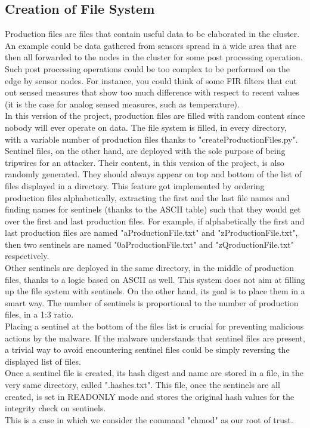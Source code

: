 \subsection{Creation of File System}
Production files are files that contain useful data to be elaborated in the cluster. An example could be data gathered from sensors spread in a wide area that are then all forwarded to the nodes in the cluster for some post processing operation. Such post processing operations could be too complex to be performed on the edge by sensor nodes. For instance, you could think of some FIR filters that cut out sensed measures that show too much difference with respect to recent values (it is the case for analog sensed measures, such as temperature).\\
In this version of the project, production files are filled with random content since nobody will ever operate on data. The file system is filled, in every directory, with a variable number of production files thanks to "createProductionFiles.py".\\
Sentinel files, on the other hand, are deployed with the sole purpose of being tripwires for an attacker. Their content, in this version of the project, is also randomly generated. They should always appear on top and bottom of the list of files displayed in a directory. This feature got implemented by ordering production files alphabetically, extracting the first and the last file names and finding names for sentinels (thanks to the ASCII table) such that they would get over the first and last production files. For example, if alphabetically the first and last production files are named "aProductionFile.txt" and "zProductionFile.txt", then two sentinels are named "0aProductionFile.txt" and "zQroductionFile.txt" respectively.\\
Other sentinels are deployed in the same directory, in the middle of production files, thanks to a logic based on ASCII as well. This system does not aim at filling up the file system with sentinels. On the other hand, its goal is to place them in a smart way. The number of sentinels is proportional to the number of production files, in a 1:3 ratio.\\
Placing a sentinel at the bottom of the files list is crucial for preventing malicious actions by the malware. If the malware understands that sentinel files are present, a trivial way to avoid encountering sentinel files could be simply reversing the displayed list of files.\\
Once a sentinel file is created, its hash digest and name are stored in a file, in the very same directory, called ".hashes.txt". This file, once the sentinels are all created, is set in READONLY mode and stores the original hash values for the integrity check on sentinels.\\
This is a case in which we consider the command "chmod" as our root of trust.\\


